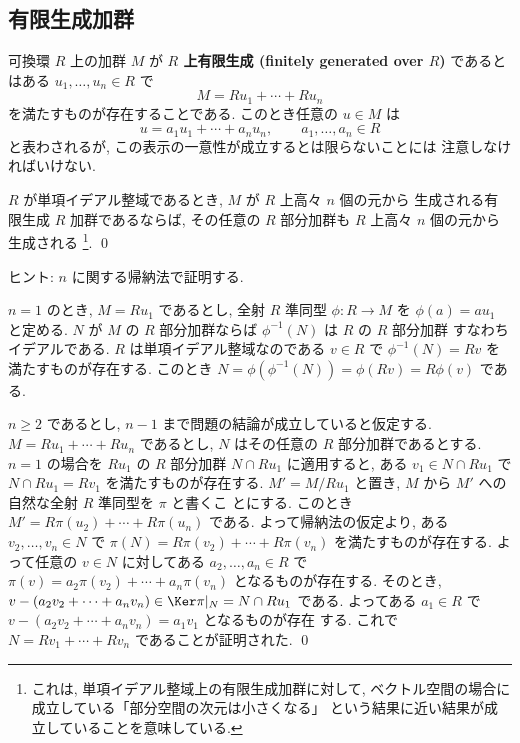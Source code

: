 \documentclass[12pt,twoside]{jarticle}
\begin{document}

\subsection{有限生成加群}
\label{sec:finitely-generated-module}

可換環 $R$ 上の加群 $M$ が {\bf $R$ 上有限生成 (finitely generated over
$R$)} であるとはある $u_1,\dots,u_n\in R$ で
\begin{equation*}
  M = Ru_1 + \cdots + Ru_n
\end{equation*}
を満たすものが存在することである.  このとき任意の $u\in M$ は
\begin{equation*}
  u = a_1 u_1 + \cdots + a_n u_n,
  \qquad
  a_1,\dots,a_n\in R
\end{equation*}
と表わされるが, この表示の一意性が成立するとは限らないことには
注意しなければいけない.


\begin{question}
\label{q:fin-gen}
  $R$ が単項イデアル整域であるとき, $M$ が $R$ 上高々 $n$ 個の元から
  生成される有限生成 $R$ 加群であるならば, 
  その任意の $R$ 部分加群も $R$ 上高々 $n$ 個の元から生成される%
  \footnote{これは, 単項イデアル整域上の有限生成加群に対して,
    ベクトル空間の場合に成立している「部分空間の次元は小さくなる」
    という結果に近い結果が成立していることを意味している.}.
  \qed
\end{question}

\noindent
ヒント: $n$ に関する帰納法で証明する.

$n=1$ のとき,  $M=Ru_1$ であるとし, 
全射 $R$ 準同型 $\phi:R\to M$ を $\phi(a)=au_1$ と定める. 
$N$ が $M$ の $R$ 部分加群ならば $\phi^{-1}(N)$ は $R$ の $R$ 部分加群
すなわちイデアルである.  $R$ は単項イデアル整域なのである $v\in R$ 
で $\phi^{-1}(N)=Rv$ を満たすものが存在する. 
このとき $N=\phi(\phi^{-1}(N))=\phi(Rv)=R\phi(v)$ である.

$n\ge 2$ であるとし, $n-1$ まで問題の結論が成立していると仮定する.
$M=Ru_1+\cdots+Ru_n$ であるとし, $N$ はその任意の $R$ 部分加群であるとする. 
$n=1$ の場合を $Ru_1$ の $R$ 部分加群 $N\cap Ru_1$ に適用すると, 
ある $v_1\in N\cap Ru_1$ で $N\cap Ru_1 = Rv_1$ を満たすものが存在する.
$M'=M/Ru_1$ と置き, $M$ から $M'$ への自然な全射 $R$ 準同型を $\pi$ と書くこ
とにする. このとき $M'=R\pi(u_2)+\cdots+R\pi(u_n)$ である.
よって帰納法の仮定より, ある  $v_2,\dots,v_n\in N$ 
で $\pi(N)=R\pi(v_2)+\cdots+R\pi(v_n)$ を満たすものが存在する.
よって任意の $v\in N$ に対してある $a_2,\dots,a_n\in R$ 
で $\pi(v)=a_2\pi(v_2)+\cdots+a_n\pi(v_n)$ となるものが存在する.
そのとき, $v-(a_2v_2+\cdots+a_nv_n)\in\Ker\pi|_N=N\cap Ru_1$ である.
よってある $a_1\in R$ で $v-(a_2v_2+\cdots+a_nv_n)=a_1v_1$ となるものが存在
する.  これで $N=Rv_1+\cdots+Rv_n$ であることが証明された.
\qed
\end{document}
